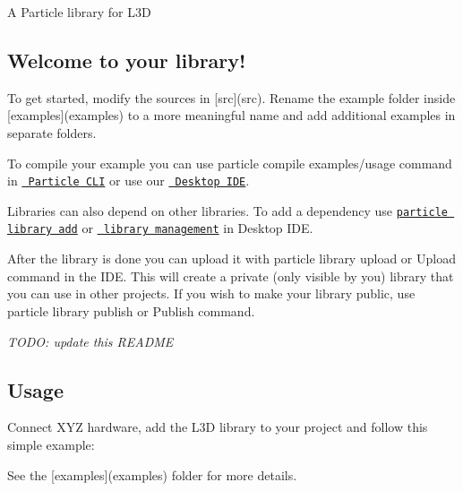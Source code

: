 A Particle library for L3D

\subsection*{Welcome to your library!}

To get started, modify the sources in \mbox{[}src\mbox{]}(src). Rename the example folder inside \mbox{[}examples\mbox{]}(examples) to a more meaningful name and add additional examples in separate folders.

To compile your example you can use {\ttfamily particle compile examples/usage} command in \href{https://docs.particle.io/guide/tools-and-features/cli\#update-your-device-remotely}{\texttt{ Particle C\+LI}} or use our \href{https://docs.particle.io/guide/tools-and-features/dev/\#compiling-code}{\texttt{ Desktop I\+DE}}.

Libraries can also depend on other libraries. To add a dependency use \href{https://docs.particle.io/guide/tools-and-features/cli\#adding-a-library}{\texttt{ {\ttfamily particle library add}}} or \href{https://docs.particle.io/guide/tools-and-features/dev/\#managing-libraries}{\texttt{ library management}} in Desktop I\+DE.

After the library is done you can upload it with {\ttfamily particle library upload} or {\ttfamily Upload} command in the I\+DE. This will create a private (only visible by you) library that you can use in other projects. If you wish to make your library public, use {\ttfamily particle library publish} or {\ttfamily Publish} command.

{\itshape T\+O\+DO\+: update this R\+E\+A\+D\+ME}

\subsection*{Usage}

Connect X\+YZ hardware, add the L3D library to your project and follow this simple example\+:


\begin{DoxyCode}{0}
\DoxyCodeLine{}
\DoxyCodeLine{\}}
\DoxyCodeLine{}
\DoxyCodeLine{\}}
\end{DoxyCode}


See the \mbox{[}examples\mbox{]}(examples) folder for more details.

